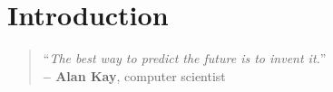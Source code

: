 


%

\chapter{Introduction}%
\label{cha:introduction}
%
\begin{quote}
\begin{flushright}
``\emph{The best way to predict the future is to invent it.}'' \\
\textbf{-- Alan Kay}, computer scientist
\end{flushright}
\end{quote}

